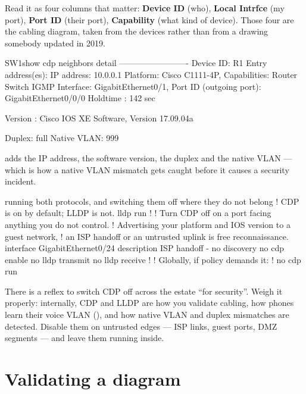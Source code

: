 Read it as four columns that matter: \textbf{Device ID} (who), \textbf{Local
Intrfce} (my port), \textbf{Port ID} (their port), \textbf{Capability} (what kind
of device). Those four are the cabling diagram, taken from the devices rather
than from a drawing somebody updated in 2019.

\begin{verify}{SW1}{show cdp neighbors detail}
-------------------------
Device ID: R1
Entry address(es):
  IP address: 10.0.0.1
Platform: Cisco C1111-4P,  Capabilities: Router Switch IGMP
Interface: GigabitEthernet0/1,  Port ID (outgoing port): GigabitEthernet0/0/0
Holdtime : 142 sec

Version :
Cisco IOS XE Software, Version 17.09.04a

Duplex: full
Native VLAN: 999
\end{verify}

 adds the IP address, the software version, the duplex and the native
VLAN --- which is how a native VLAN mismatch gets caught before it causes a
security incident.

\begin{config}{running both protocols, and switching them off where they do not belong}
! CDP is on by default; LLDP is not.
lldp run
!
! Turn CDP off on a port facing anything you do not control.
! Advertising your platform and IOS version to a guest network,
! an ISP handoff or an untrusted uplink is free reconnaissance.
interface GigabitEthernet0/24
 description ISP handoff - no discovery
 no cdp enable
 no lldp transmit
 no lldp receive
!
! Globally, if policy demands it:
!   no cdp run
\end{config}

\begin{alertbox}
There is a reflex to switch CDP off across the estate ``for security''. Weigh it
properly: internally, CDP and LLDP are how you validate cabling, how phones learn
their voice VLAN (), and how native VLAN and duplex mismatches
are detected. Disable them on untrusted edges --- ISP links, guest ports, DMZ
segments --- and leave them running inside.
\end{alertbox}

\section{Validating a diagram}

